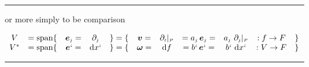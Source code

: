 \documentclass[
]{book}
\theoremstyle{definition}
\theoremstyle{definition}
\theoremstyle{definition}
\theoremstyle{definition}
\theoremstyle{remark}
\begin{document}
\begin{center}\rule{0.5\linewidth}{0.5pt}\end{center}

or more simply to be comparison

\[
\begin{array}{ccccccccccc}
V & =\mathrm{span}\{ & \boldsymbol{e}_{{\scriptscriptstyle j}}= & \partial_{{\scriptscriptstyle j}} & \}=\{ & \boldsymbol{v}= & \partial_{{\scriptscriptstyle t}}|_{{\scriptscriptstyle P}} & =a_{{\scriptscriptstyle j}}\thinspace\boldsymbol{e}_{{\scriptscriptstyle j}}= & a_{{\scriptscriptstyle j}}\ \partial_{{\scriptscriptstyle j}}|_{{\scriptscriptstyle P}} & :f\rightarrow F & \}\\
V^{*} & =\mathrm{span}\{ & \boldsymbol{e}^{{\scriptscriptstyle i}}= & \mathrm{d}x^{{\scriptscriptstyle i}} & \}=\{ & \boldsymbol{\omega}= & \mathrm{d}f & =b^{{\scriptscriptstyle i}}\thinspace\boldsymbol{e}^{{\scriptscriptstyle i}}= & b^{{\scriptscriptstyle i}}\ \mathrm{d}x^{{\scriptscriptstyle i}} & :V\rightarrow F & \}
\end{array}
\]

\begin{center}\rule{0.5\linewidth}{0.5pt}\end{center}
\end{document}
